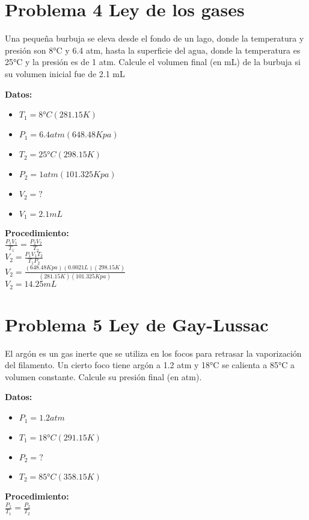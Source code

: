 \documentclass[12pt, letterpaper]{article}
\begin{document}
\section{Problema 4 Ley de los gases}
Una pequeña burbuja se eleva desde el fondo de un lago, donde la temperatura y presión son 8°C
y 6.4 atm, hasta la superficie del agua, donde la temperatura es 25°C y la presión es de 1 atm.
Calcule el volumen final (en mL) de la burbuja si su volumen inicial fue de 2.1 mL
\begin{multicols}{2}
\large \textbf{Datos:}
\begin{itemize}
    \item $T_1 = 8°C(281.15K)$
    \item $P_1 = 6.4 atm (648.48 Kpa)$
    \item $T_2 = 25°C (298.15K)$
    \item $P_2 = 1atm (101.325Kpa)$
    \item $V_2 = ?$
    \item $V_1 = 2.1 mL$ 
\end{itemize}
\columnbreak

\large \textbf{Procedimiento:}\\

\large {$\frac{P_1V_1}{T_1}=\frac{P_2V_2}{T_2}$}\\

\large {$V_2 =\frac{P_1V_1T_2}{T_1P_2}$}\\

\large {$V_2 =\frac{(648.48Kpa)(0.0021L)(298.15K)}{(281.15K)(101.325Kpa)}$}\\

\ul {\large $V_2 = 14.25 mL$}
\end{multicols}


\section{Problema 5 Ley de Gay-Lussac}

El argón es un gas inerte que se utiliza en los focos para retrasar la vaporización del filamento. Un
cierto foco tiene argón a 1.2 atm y 18°C se calienta a 85°C a volumen constante. Calcule su presión
final (en atm).

\begin{multicols}{2}
\large \textbf{Datos:}
\begin{itemize}
    \item $P_1 = 1.2 atm$
    \item $T_1 = 18°C (291.15K)$
    \item $P_2 = ?$
    \item $T_2 = 85°C (358.15 K)$
\end{itemize}
\columnbreak


\large \textbf{Procedimiento:}\\

\large {$\frac{P_1}{T_1} = \frac{P_2}{T_2}$}



\end{multicols}
\end{document}
